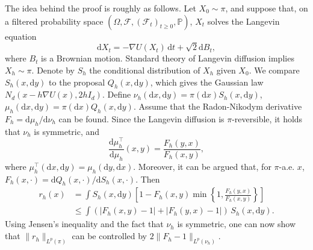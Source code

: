 \documentclass[11pt]{article}
\newcommand{\1}{\mathbf 1}
\newcommand{\df}{\mathrm{d}}
\begin{document}
	The idea behind the proof is roughly as follows.
	Let $X_0 \sim \pi$, and suppose that, on a filtered probability space $(\Omega,\mathcal F,(\mathcal F_t)_{t\geq0},\mathbb P)$, $X_t$ solves the Langevin equation
	\begin{equation} \label{eq:langevin}
		\df X_t = -\nabla U(X_t) \, \df t + \sqrt{2} \df B_t,
	\end{equation}
	where $B_t$ is a Brownian motion.
	Standard theory of Langevin diffusion implies $X_h \sim \pi$.
	Denote by $S_h$ the conditional distribution of $X_h$ given $X_0$.
	We compare $S_h(x, \df y)$ to the proposal $Q_h(x, \df y)$, which gives the Gaussian law $N_d(x - h \nabla U(x), 2h I_d)$.
	Define $\nu_h(\df x, \df y) = \pi(\df x) S_h(x, \df y)$, $\mu_h(\df x, \df y) = \pi(\df x) Q_h(x, \df y)$.
	Assume that the Radon-Nikodym derivative $F_h = \df \mu_h/\df \nu_h$ can be found.
	Since the Langevin diffusion is $\pi$-reversible, it holds that $\nu_h$ is symmetric, and
	\[
	\frac{\df \mu_h^{\top}}{\df \mu_h}(x,y) = \frac{F_h(y,x)}{F_h(x,y)},
	\]
	where $\mu_h^{\top}(\df x, \df y) = \mu_h(\df y, \df x)$.
	Moreover, it can be argued that, for $\pi$-a.e. $x$, $F_h(x, \cdot) = \df Q_h(x,\cdot)/\df S_h(x,\cdot)$.
	Then
	\[
	\begin{aligned}
		r_h(x) &= \int S_h(x, \df y) \left[ 1 - F_h(x,y) \min\left\{ 1, \frac{F_h(y,x)}{F_h(x,y)} \right\} \right]  \\
		&\leq \int(|F_h(x,y) - 1| + |F_h(y,x) - 1|) \, S_h(x, \df y).
	\end{aligned}
	\]
	Using Jensen's inequality and the fact that $\nu_h$ is symmetric, one can now show that $\|r_h\|_{L^p(\pi)}$ can be controlled by $2 \|F_h - 1\|_{L^p(\nu_h)}$.
	
\end{document}
